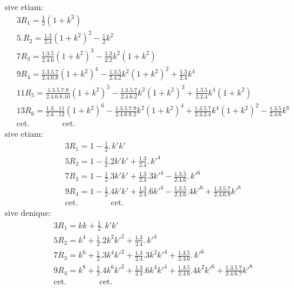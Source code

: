 \documentclass{article}
\begin{document}
sive etiam:
\[
\begin{gathered}
3R_{1}=\frac{1}{2}(1+k^{2})\\[1.5ex]
5.R_{2}=\frac{1.3}{2.4}(1+k^{2})^{2}-\frac{1}{2}k^{2}\\[1.5ex]
7R_{3}=\frac{1.3.5}{2.4.6}(1+k^{2})^{3}-\frac{1.3}{2.2}k^{2}(1+k^{2})\\[1.5ex]
9R_{4}=\frac{1.3.5.7}{2.4.6.8}(1+k^{2})^{4}-\frac{1.3.5}{2.4.2}k^{2}(1+k^{2})^{2}+\frac{1.3}{2.4}k^{4}\\[1.5ex]
11R_{5}=\frac{1.3.5.7.9}{2.4.6.8.10}(1+k^{2})^{5}-\frac{1.3.5.7}{2.4.6.2}k^{2}(1+k^{2})^{3}+\frac{1.3.5}{2.2.4}k^{4}(1+k^{2})\\[1.5ex]
13R_{6}=\frac{1.3.\,.\,11}{2.4.\,.\,12}(1+k^{2})^{6}-\frac{1.3.5.7.9}{2.4.6.8.2}k^{2}(1+k^{2})^{4}+\frac{1.3.5.7}{2.4.2.4}k^{4}(1+k^{2})^{2}-\frac{1.3.5}{2.4.6}k^{6}\\[1.5ex]
\text{cet.}\qquad\qquad\text{cet.}
\end{gathered}
\]
sive etiam:
\[
\begin{gathered}
3R_{1}=1-\frac{1}{2}.\,k'k'\\[1.5ex]
5R_{2}=1-\frac{1}{2}.2k'k'+\frac{1.3}{2.4}.\,k'^{4}\\[1.5ex]
7R_{3}=1-\frac{1}{2}.3k'k'+\frac{1.3}{2.4}.3k'^{4}-\frac{1.3.5}{2.4.6}.\,k'^{6}\\[1.5ex]
9R_{4}=1-\frac{1}{2}.4k'k'+\frac{1.3}{2.4}.6k'^{4}-\frac{1.3.5}{2.4.6}.4k'^{6}+\frac{1.3.5.7}{2.4.6.8}k'^{8}\\[1.5ex]
\text{cet.}\qquad\qquad\text{cet.}
\end{gathered}
\]
sive denique:
\[
\begin{gathered}
3R_{1}=kk+\frac{1}{2}.\,k'k'\\[1.5ex]
5R_{2}=k^{4}+\frac{1}{2}.2k^{2}k'^{2}+\frac{1.3}{2.4}.\,k'^{4}\\[1.5ex]
7R_{3}=k^{6}+\frac{1}{2}.3k^{4}k'^{2}+\frac{1.3}{2.4}.3k^{2}k'^{4}+\frac{1.3.5}{2.4.6}.\,k'^{6}\\[1.5ex]
9R_{4}=k^{8}+\frac{1}{2}.4k^{6}k'^{2}+\frac{1.3}{2.4}.6k^{4}k'^{4}+\frac{1.3.5}{2.4.6}.4k^{2}k'^{6}+\frac{1.3.5.7}{2.4.6.7}k'^{8}\\[1.5ex]
\text{cet.}\qquad\qquad\text{cet.}
\end{gathered}
\]
\end{document}
